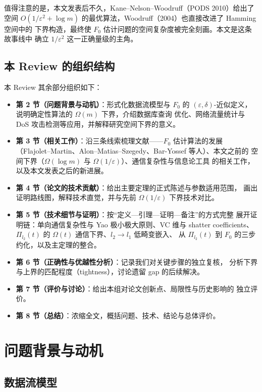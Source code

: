 \documentclass[UTF8, 11pt, a4paper, linestretch=1.15]{ctexart}
\theoremstyle{zhstyle}
\newcommand{\eps}{\varepsilon}
\newcommand{\Fzero}{F_0}
\begin{document}
	值得注意的是，本文发表后不久，Kane--Nelson--Woodruff（PODS 2010）给出了空间
	$O(1/\eps^2 + \log m)$ 的最优算法，Woodruff（2004）也直接改进了 Hamming 空间中的
	下界构造，最终使 $\Fzero$ 估计问题的空间复杂度被完全刻画。本文是这条故事线中
	确立 $1/\eps^2$ 这一正确量级的主角。
	
	\subsection{本 Review 的组织结构}
	
	本 Review 其余部分组织如下：
	
	\begin{itemize}
		\item \textbf{第 2 节（问题背景与动机）}：形式化数据流模型与 $\Fzero$ 的
		$(\eps, \delta)$-近似定义，说明确定性算法的 $\Omega(m)$ 下界，介绍数据库查询
		优化、网络流量统计与 DoS 攻击检测等应用，并解释研究空间下界的意义。
		\item \textbf{第 3 节（相关工作）}：沿三条线索梳理文献——$\Fzero$ 估计算法的发展
		（Flajolet--Martin、Alon--Matias--Szegedy、Bar-Yossef 等人）、本文之前的
		空间下界（$\Omega(\log m)$ 与 $\Omega(1/\eps)$）、通信复杂性与信息论工具
		的相关工作，以及本文发表之后的新进展。
		\item \textbf{第 4 节（论文的技术贡献）}：给出主要定理的正式陈述与参数适用范围，
		画出证明路线图，解释技术直觉，并与先前 $\Omega(1/\eps)$ 下界技术对比。
		\item \textbf{第 5 节（技术细节与证明）}：按“定义—引理—证明—备注”的方式完整
		展开证明链：单向通信复杂性与 Yao 极小极大原则、VC 维与 shatter
		coefficients、$\Pi_{l_2}(t)$ 的 $\Omega(t)$ 通信下界、$l_2 \to l_1$ 低畸变嵌入、
		从 $\Pi_{l_2}(t)$ 到 $\Fzero$ 的三步约化，以及主定理的整合。
		\item \textbf{第 6 节（正确性与优越性分析）}：记录我们对关键步骤的独立复核，
		分析下界与上界的匹配程度（tightness），讨论遗留 gap 的后续解决。
		\item \textbf{第 7 节（评价与讨论）}：给出本组对论文创新点、局限性与历史影响的
		独立评价。
		\item \textbf{第 8 节（总结）}：浓缩全文，概括问题、技术、结论与总体评价。
	\end{itemize}
	
	\section{问题背景与动机}
	
	\subsection{数据流模型}
	
\end{document}
